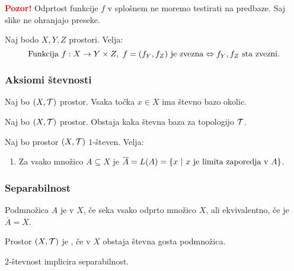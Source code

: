 \textbf{\textcolor{red}{Pozor!}} Odprtost funkcije $f$ v splošnem ne moremo testirati na predbaze. Saj slike ne ohranjajo preseke.

\begin{trditev}
    Naj bodo $X, Y, Z$ prostori. Velja:
    $$\text{Funkcija } f:X \to Y \times Z, \ f = (f_Y, f_Z) \text{ je zvezna} \Leftrightarrow f_Y, f_Z \text{ sta zvezni}.$$
\end{trditev}

\subsubsection{Aksiomi števnosti}

\begin{definicija}
    Naj bo $(X, \mathcal{T})$ prostor. Vsaka točka $x \in X$ ima števno bazo okolic.
\end{definicija}

\begin{definicija}
    Naj bo $(X, \mathcal{T})$ prostor. Obstaja kaka števna baza za topologijo $\mathcal{T}$.
\end{definicija}

\begin{trditev}
    Naj bo prostor $(X, \mathcal{T})$ $1$-števen. Velja:
    \begin{enumerate}
        \item Za vsako množico $A \subseteq X$ je $\overline{A} = L(A) = \left\{x \ | \ x \text{ je limita zaporedja v } A\right\}$.
    \end{enumerate}
\end{trditev}

\subsubsection{Separabilnost}
\begin{definicija}
    Podmnožica $A$ je  v $X$, če seka vsako odprto množico $X$, ali ekvivalentno, če je $\overline{A} = X$.
\end{definicija}

\begin{definicija}
    Prostor $(X, \mathcal{T})$ je , če v $X$ obstaja števna gosta podmnožica.
\end{definicija}

\begin{trditev}
    $2$-števnost implicira separabilnost.
\end{trditev}

